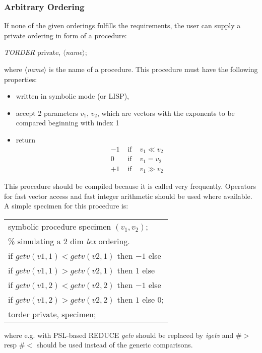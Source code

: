 \subsubsection{Arbitrary Ordering}
 
If none of the given orderings fulfills the requirements, the user can
supply a private ordering in form of a procedure:
\begin{center}
{\it TORDER} private, $\langle${\it name}$\rangle$;
\end{center}
where $\langle${\it name}$\rangle$ is the name of  a procedure. This
procedure must have the following properties:
\begin{itemize}
\item written in symbolic mode (or LISP),
\item accept 2 parameters $v_1$, $v_2$, which are vectors with the
exponents to be compared beginning with index 1
\item return
\[
\begin{array}{rll}
-1 & \mbox{ if } & v_1 \ll v_2 \\
 0 & \mbox{ if } & v_1 = v_2 \\
+1 & \mbox{ if } & v_1 \gg v_2
\end{array}
\]
\end{itemize}
This procedure should be compiled because it is called very frequently.
Operators for fast vector access and fast integer arithmetic should be
used where available. A simple specimen for this procedure is:
 \begin{center}
\begin{tabular}{l}
\hspace*{-1cm}symbolic procedure specimen $(v_1,v_2)$;
\vspace*{1mm}\\
\% simulating a 2 dim {\it lex} ordering. \\
if $getv(v1,1) < getv(v2,1)$ then $-1$ else \\
if $getv(v1,1) > getv(v2,1)$ then $1$ else \\
if $getv(v1,2) < getv(v2,2)$ then $-1$ else \\
if $getv(v1,2) > getv(v2,2)$ then $1$ else 0; \vspace*{2mm} \\
\hspace*{-1cm}torder private, specimen;
\end{tabular}
\end{center}


where e.g. with PSL-based REDUCE {\it getv} should be replaced by {\it
igetv} and $\#>$ resp $\#<$ should be used instead of the generic
comparisons.

